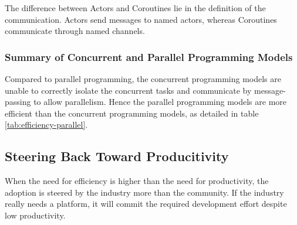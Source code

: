 The difference between Actors and Coroutines lie in the definition of the communication.
Actors send messages to named actors, whereas Coroutines communicate through named channels.

\subsubsection{Summary of Concurrent and Parallel Programming Models}

Compared to parallel programming, the concurrent programming models are unable to correctly isolate the concurrent tasks and communicate by message-passing to allow parallelism.
Hence the parallel programming models are more efficient than the concurrent programming models, as detailed in table \ref{tab:efficiency-parallel}.


\subsection{Steering Back Toward Producitivity} \label{chapter3:software-efficiency:adoption}

\begin{figure}[h!]
%
\end{figure}

When the need for efficiency is higher than the need for productivity, the adoption is steered by the industry more than the community.
If the industry really needs a platform, it will commit the required development effort despite low productivity.


